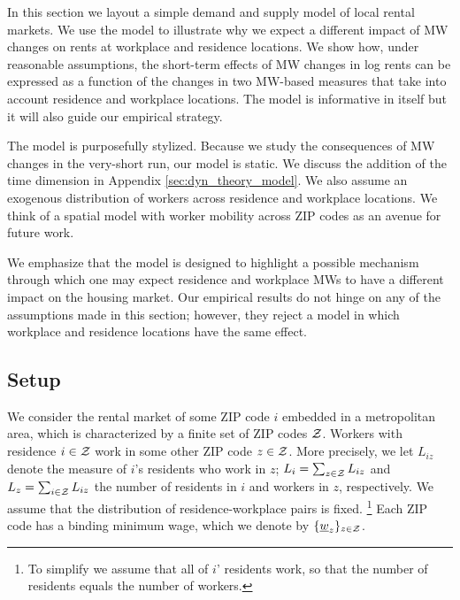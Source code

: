 
In this section we layout a simple demand and supply model of local rental markets.
We use the model to illustrate why we expect a different impact of MW changes 
on rents at workplace and residence locations.
We show how, under reasonable assumptions, the short-term effects of MW changes 
in log rents can be expressed as a function of the changes in two MW-based measures
that take into account residence and workplace locations.
The model is informative in itself but it will also guide our empirical strategy.

The model is purposefully stylized.
Because we study the consequences of MW changes in the very-short run, our model is 
static.
We discuss the addition of the time dimension in Appendix \ref{sec:dyn_theory_model}.
We also assume an exogenous distribution of workers across residence and workplace 
locations.
We think of a spatial model with worker mobility across ZIP codes as an avenue 
for future work.

We emphasize that the model is designed to highlight a possible mechanism through 
which one may expect residence and workplace MWs to have a different impact on the 
housing market.
Our empirical results do not hinge on any of the assumptions made in this section;
however, they reject a model in which workplace and residence locations have the 
same effect.

\subsection{Setup}

We consider the rental market of some ZIP code $i$ embedded in a metropolitan area, 
which is characterized by a finite set of ZIP codes $\mathcal{Z}$.
Workers with residence $i\in\mathcal{Z}$ work in some other ZIP code $z\in\mathcal{Z}$. 
More precisely, we let $L_{iz}$ denote the measure of $i$'s residents who work in $z$;
$L_i = \sum_{z \in \mathcal{Z}} L_{iz}$ and $L_z = \sum_{i \in \mathcal{Z}} L_{iz}$ 
the number of residents in $i$ and workers in $z$, respectively.
We assume that the distribution of residence-workplace pairs is fixed.%
\footnote{To simplify we assume that all of $i$' residents work, so that the number
of residents equals the number of workers.}
Each ZIP code has a binding minimum wage, which we denote by 
$\{\underline{w}_z\}_{z\in\mathcal{Z}}$.


